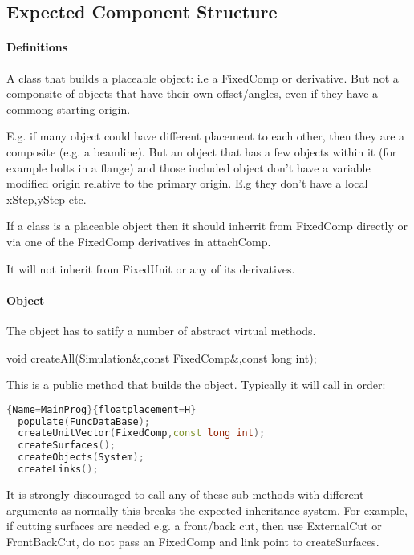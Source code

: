 \subsection{Expected Component Structure}
\label{Sec:Structure}

\paragraph{Definitions}

A class that builds a placeable object: i.e a FixedComp or
derivative. But not a componsite of objects that have their own
offset/angles, even if they have a commong starting origin.

E.g. if many object could have different placement to each other, then
they are a composite (e.g. a beamline). But an object that has a few
objects within it (for example bolts in a flange) and those included
object don't have a variable modified origin relative to the primary
origin. E.g they don't have a local xStep,yStep etc.


If a class is a placeable object then it should inherrit from
FixedComp directly or via one of the FixedComp derivatives in
attachComp.

It will not inherit from FixedUnit or any of its derivatives.



\paragraph{Object}

The object has to satify a number of abstract virtual methods.

void createAll(Simulation\&,const FixedComp\&,const long int);

This is a public method that builds the object. Typically it will call
in order:

\begin{lstlisting}[language=C++]{Name=MainProg}{floatplacement=H}
  populate(FuncDataBase);
  createUnitVector(FixedComp,const long int);
  createSurfaces();
  createObjects(System);
  createLinks();
\end{lstlisting}

It is strongly discouraged to call any of these sub-methods with
different arguments as normally this breaks the expected inheritance
system. For example, if cutting surfaces are needed e.g. a front/back
cut, then use ExternalCut or FrontBackCut, do not pass an FixedComp
and link point to createSurfaces.


